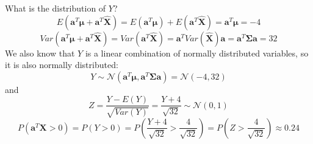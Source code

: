 \documentclass{article}
\let\normalmu\mu
\let\normalSigma\Sigma
\renewcommand{\mu}{\bm{\normalmu}} %
\renewcommand{\Sigma}{\bm{\normalSigma}} %
\begin{document}
What is the distribution of $Y$?
\[E\left( {{{\mathbf{a}}^T}{\mathbf{\mu }} + {{\mathbf{a}}^T}{\mathbf{\hat X}}} \right) = E\left( {{{\mathbf{a}}^T}{\mathbf{\mu }}} \right) + E\left( {{{\mathbf{a}}^T}{\mathbf{\hat X}}} \right) = {{\mathbf{a}}^T}{\mathbf{\mu }} = -4\]
\[Var\left( {{{\mathbf{a}}^T}{\mathbf{\mu }} + {{\mathbf{a}}^T}{\mathbf{\hat X}}} \right) = Var\left( {{{\mathbf{a}}^T}{\mathbf{\hat X}}} \right) = {{\mathbf{a}}^T}Var\left( {{\mathbf{\hat X}}} \right){\mathbf{a}} = {{\mathbf{a}}^T}{\mathbf{\Sigma a}} = 32\]
We also know that $Y$ is a linear combination of normally distributed variables, so it is also normally distributed:
\[Y\sim \mathcal N({{\mathbf{a}}^T}{\mathbf{\mu }}, {{\mathbf{a}}^T}{\mathbf{\Sigma a}}) = \mathcal N(-4, 32)\]
and
\[Z=\frac{Y - E(Y)}{\sqrt{Var(Y)}} = \frac{Y + 4}{\sqrt{32}} \sim \mathcal N(0, 1)\]
\[P\left( {{{\mathbf{a}}^T}{\mathbf{X}} > 0} \right) = P\left( {Y > 0} \right) = P\left( {\frac{{Y + 4}}{{\sqrt {32} }} > \frac{4}{{\sqrt {32} }}} \right) = P\left( {Z > \frac{4}{{\sqrt {32} }}} \right) \approx 0.24\]
\end{document}
